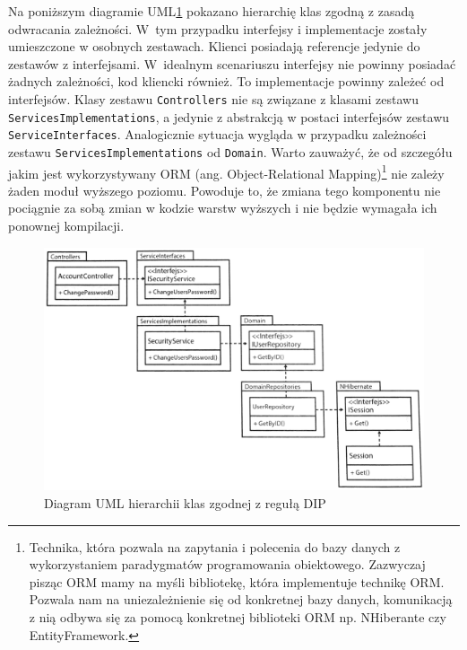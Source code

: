 Na poniższym diagramie UML\ref{lab1/fig/DipUml} pokazano hierarchię klas zgodną z zasadą odwracania zależności. W~tym przypadku interfejsy i implementacje zostały umieszczone w osobnych zestawach. Klienci posiadają referencje jedynie do zestawów z interfejsami. W~idealnym scenariuszu interfejsy nie powinny posiadać żadnych zależności, kod kliencki również. To implementacje powinny zależeć od interfejsów. Klasy zestawu \texttt{Controllers} nie są związane z klasami zestawu \texttt{ServicesImplementations}, a jedynie z abstrakcją w postaci interfejsów zestawu \texttt{ServiceInterfaces}. Analogicznie sytuacja wygląda w przypadku zależności zestawu \texttt{ServicesImplementations} od \texttt{Domain}. Warto zauważyć, że od szczegółu jakim jest wykorzystywany ORM (ang. Object-Relational Mapping)\footnote{Technika, która pozwala na zapytania i polecenia do bazy danych z wykorzystaniem paradygmatów programowania obiektowego. Zazwyczaj pisząc ORM mamy na myśli bibliotekę, która implementuje technikę ORM. Pozwala nam na uniezależnienie się od konkretnej bazy danych, komunikacją z nią odbywa się za pomocą konkretnej biblioteki ORM np. NHiberante czy EntityFramework.} nie zależy żaden moduł wyższego poziomu. Powoduje to, że zmiana tego komponentu nie pociągnie za sobą zmian w kodzie warstw wyższych i nie będzie wymagała ich ponownej kompilacji. 
\begin{figure}[hbt!]
	\centering
	\includegraphics[width=0.9\linewidth]{images/SolidDip}
	\caption{Diagram UML hierarchii klas zgodnej z regułą DIP\cite{adaptatywny_kod_hall}}
	\label{lab1/fig/DipUml}
\end{figure}

